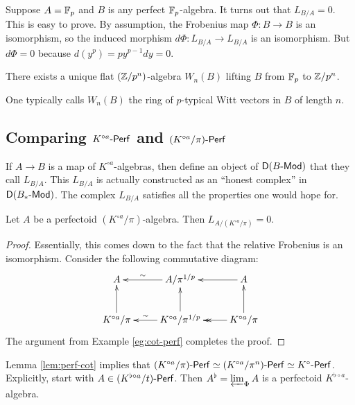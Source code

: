 \begin{example}\label{eg:cot-perf}
Suppose $A=\mathbb{F}_p$ and $B$ is any perfect $\mathbb{F}_p$-algebra. It turns out that 
$L_{B/A}=0$. This is easy to prove. By assumption, the Frobenius map 
$\Phi:B\to B$ is an isomorphism, so the induced morphism 
$d\Phi:L_{B/A} \to L_{B/A}$ is an isomorphism. But $d\Phi=0$ because 
$d(y^p) = p y^{p-1} d y = 0$. 
\end{example}

\begin{corollary}
There exists a unique flat $(\mathbb{Z}/p^n)$-algebra $W_n(B)$ lifting $B$ from 
$\mathbb{F}_p$ to $\mathbb{Z}/p^n$. 
\end{corollary}

One typically calls $W_n(B)$ the ring of $p$-typical Witt vectors in $B$ 
of length $n$. 





\subsection{Comparing \texorpdfstring{$K^{\circ a}\textnormal{-}\mathsf{Perf}$}{Koa-Perf} and \texorpdfstring{$(K^{\circ a}/\pi)\textnormal{-}\mathsf{Perf}$}{Koa/pi-Perf}}

If $A\to B$ is a map of $K^{\circ a}$-algebras, then \cite{gr03} define 
an object of $\mathsf D(B\textnormal{-}\mathsf{Mod})$ that they call $L_{B/A}$. This $L_{B/A}$ is actually 
constructed as an ``honest complex'' in $\mathsf D(B_\ast\textnormal{-}\mathsf{Mod})$. The complex 
$L_{B/A}$ satisfies all the properties one would hope for. 

\begin{lemma}\label{lem:perf-cot}
Let $A$ be a perfectoid $(K^{\circ a}/\pi)$-algebra. Then 
$L_{A/(K^{\circ a}/\pi)}=0$. 
\end{lemma}
\begin{proof}
Essentially, this comes down to the fact that the relative Frobenius is an 
isomorphism. Consider the following commutative diagram:
\[\xymatrix{
  A 
    & A/\pi^{1/p} \ar[l]_-\sim
    & A \ar[l] \\
  K^{\circ a}/\pi \ar[u] 
    & K^{\circ a}/\pi^{1/p} \ar[l]_-\sim \ar[u] 
    & K^{\circ a}/\pi \ar[u] \ar@{->>}[l] 
}\]
The argument from Example \ref{eg:cot-perf} completes the proof. 
\end{proof}

Lemma \ref{lem:perf-cot} implies that 
$(K^{\circ a}/\pi)\textnormal{-}\mathsf{Perf} \simeq (K^{\circ a}/\pi^n)\textnormal{-}\mathsf{Perf} \simeq K^{\circ }\textnormal{-}\mathsf{Perf}$. 
Explicitly, start with $A\in (K^{\flat \circ a}/t)\textnormal{-}\mathsf{Perf}$. Then 
$A^\flat = \varprojlim_\Phi A$ is a perfectoid $K^{\flat\circ a}$-algebra. 





